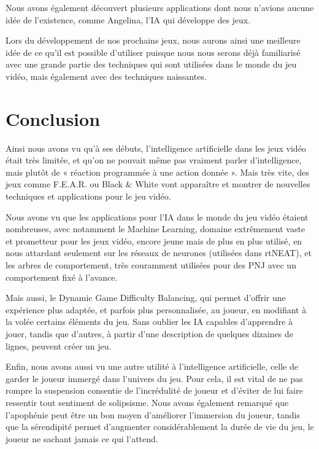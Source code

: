 \documentclass[a4paper, 12pt]{article} %
\begin{document}
Nous avons également découvert plusieurs applications dont nous n'avions aucune idée de l'existence, comme Angelina, l'IA qui développe des jeux.

Lors du développement de nos prochains jeux, nous aurons ainsi une meilleure idée de ce qu'il est possible d'utiliser puisque nous nous serons déjà familiarisé avec une grande partie des techniques qui sont utilisées dans le monde du jeu vidéo, mais également avec des techniques naissantes.


\newpage
\section{Conclusion}

Ainsi nous avons vu qu'à ses débuts, l'intelligence artificielle dans les jeux vidéo était très limitée, et qu'on ne pouvait même pas vraiment parler d'intelligence, mais plutôt de « réaction programmée à une action donnée ». Mais très vite, des jeux comme F.E.A.R. ou Black \& White vont apparaître et montrer de nouvelles techniques et applications pour le jeu vidéo.

Nous avons vu que les applications pour l'IA dans le monde du jeu vidéo étaient nombreuses, avec notamment le Machine Learning, domaine extrêmement vaste et prometteur pour les jeux vidéo, encore jeune mais de plus en plus utilisé, en nous attardant seulement sur les réseaux de neurones (utilisées dans rtNEAT), et les arbres de comportement, très couramment utilisées pour des PNJ avec un comportement fixé à l'avance.

Mais aussi, le Dynamic Game Difficulty Balancing, qui permet d'offrir une expérience plus adaptée, et parfois plus personnalisée, au joueur, en modifiant à la volée certains éléments du jeu.
Sans oublier les IA capables d'apprendre à jouer, tandis que d'autres, à partir d'une description de quelques dizaines de lignes, peuvent créer un jeu.

Enfin, nous avons aussi vu une autre utilité à l'intelligence artificielle, celle de garder le joueur immergé dans l'univers du jeu. Pour cela, il est vital de ne pas rompre la suspension consentie de l'incrédulité de joueur et d'éviter de lui faire ressentir tout sentiment de solipsisme. 
Nous avons également remarqué que l'apophénie peut être un bon moyen d'améliorer l'immersion du joueur, tandis que la sérendipité permet d'augmenter considérablement la durée de vie du jeu, le joueur ne sachant jamais ce qui l'attend.

\newpage



\end{document}
